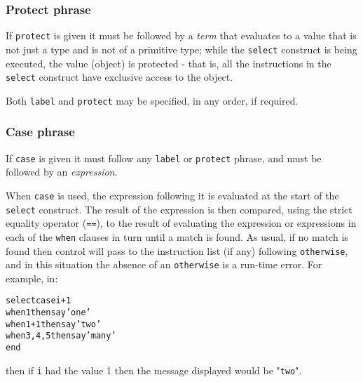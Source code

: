 \subsubsection{Protect phrase}
 
If \texttt{protect} is given it must be followed by a \emph{term}
that evaluates to a value that is not just a type and is not of a
primitive type;
while the \texttt{select} construct is being executed, the value
(object) is protected - that is, all the instructions in the
\texttt{select} construct have exclusive access to the object.
 
Both \texttt{label} and \texttt{protect} may be specified, in any order,
if required.
\subsubsection{Case phrase}
 
If \texttt{case} is given it must follow any \texttt{label} or
\texttt{protect} phrase, and must be followed by an
\emph{expression}.
 
When \texttt{case} is used, the expression following it is evaluated at
the start of the \texttt{select} construct.
The result of the expression is then compared, using the strict equality
operator (\texttt{==}), to the result of evaluating the expression
or expressions in each of the \texttt{when} clauses in turn until
a match is found.  As usual, if no match is found then control
will pass to the instruction list (if any) following
\texttt{otherwise}, and in this situation the absence of an
\texttt{otherwise} is a run-time error.
 For example, in:
\begin{alltt}
select case i+1
  when 1 then say 'one'
  when 1+1 then say 'two'
  when 3, 4, 5 then say 'many'
end
\end{alltt}
then if \texttt{i} had the value 1 then the message displayed would be
"\texttt{two}".
 
